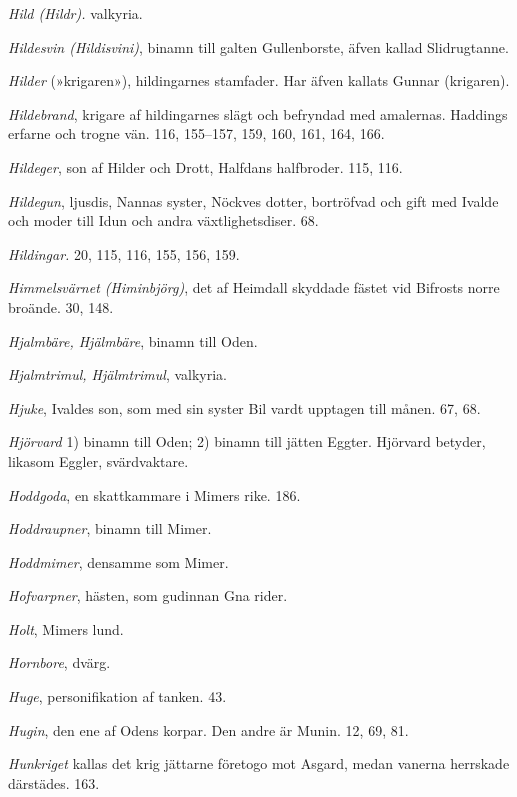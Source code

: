 \emph{Hild (Hildr).} valkyria.

\emph{Hildesvin (Hildisvini)}, binamn till galten Gullenborste, äfven
kallad Slidrugtanne.

\emph{Hilder} (»krigaren»), hildingarnes stamfader. Har äfven kallats
Gunnar (krigaren).

\emph{Hildebrand}, krigare af hildingarnes slägt och befryndad med
amalernas. Haddings erfarne och trogne vän. 116, 155--157, 159, 160,
161, 164, 166.

\protect\hypertarget{lb1625905.xhtmlux5cux23start224}{}{}\protect\hypertarget{lb1625905.xhtmlux5cux23start224-a}{}{}\protect\hypertarget{lb1625905.xhtmlux5cux23start224-b}{}{}\protect\hypertarget{lb1625905.xhtmlux5cux23start224-c}{}{}\protect\hypertarget{lb1625905.xhtmlux5cux23start224-d}{}{}

\emph{Hildeger}, son af Hilder och Drott, Halfdans halfbroder. 115, 116.

\emph{Hildegun}, ljusdis, Nannas syster, Nöckves dotter, bortröfvad och
gift med Ivalde och moder till Idun och andra växtlighetsdiser. 68.

\emph{Hildingar.} 20, 115, 116, 155, 156, 159.

\emph{Himmelsvärnet (Himinbjörg)}, det af Heimdall skyddade fästet vid
Bifrosts norre broände. 30, 148.

\emph{Hjalmbäre, Hjälmbäre}, binamn till Oden.

\emph{Hjalmtrimul, Hjälmtrimul}, valkyria.

\emph{Hjuke}, Ivaldes son, som med sin syster Bil vardt upptagen till
månen. 67, 68.

\emph{Hjörvard} 1) binamn till Oden; 2) binamn till jätten Eggter.
Hjörvard betyder, likasom Eggler, svärdvaktare.

\emph{Hoddgoda}, en skattkammare i Mimers rike. 186.

\emph{Hoddraupner}, binamn till Mimer.

\emph{Hoddmimer}, densamme som Mimer.

\emph{Hofvarpner}, hästen, som gudinnan Gna rider.

\emph{Holt}, Mimers lund.

\emph{Hornbore}, dvärg.

\emph{Huge}, personifikation af tanken. 43.

\emph{Hugin}, den ene af Odens korpar. Den andre är Munin. 12, 69, 81.

\emph{Hunkriget} kallas det krig jättarne företogo mot Asgard, medan
vanerna herrskade därstädes. 163.

